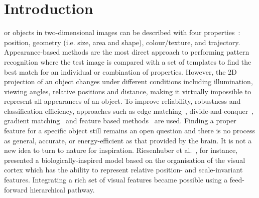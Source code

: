 \documentclass[journal]{journal}
\begin{document}
\section{Introduction}
 or objects in two-dimensional images can be described with four properties~\cite{wysoski2008fast}: position, geometry (i.e. size, area and shape), colour/texture, and trajectory. 
Appearance-based methods are the most direct approach to performing pattern recognition where the test image is compared with a set of templates to find the best match for an individual or combination of properties. 
However, the 2D projection of an object changes under different conditions including illumination, viewing angles, relative positions and distance, making it virtually impossible to represent all appearances of an object. 
To improve reliability, robustness and classification efficiency, approaches such as edge matching~\cite{canny1986computational}, divide-and-conquer~\cite{toygar2004multiple}, gradient matching~\cite{wei2006robust} and feature based methods~\cite{lowe2004distinctive, bay2008speeded} are used.
Finding a proper feature for a specific object still remains an open question and there is no process as general, accurate, or energy-efficient as that provided by the brain.
It is not a new idea to turn to nature for inspiration. 
Riesenhuber et al.~\cite{riesenhuber1999hierarchical}, for instance, presented a biologically-inspired model based on the organisation of the visual cortex which has the ability to represent relative position- and scale-invariant features.
Integrating a rich set of visual features became possible using a feed-forward hierarchical pathway. 
\end{document}
